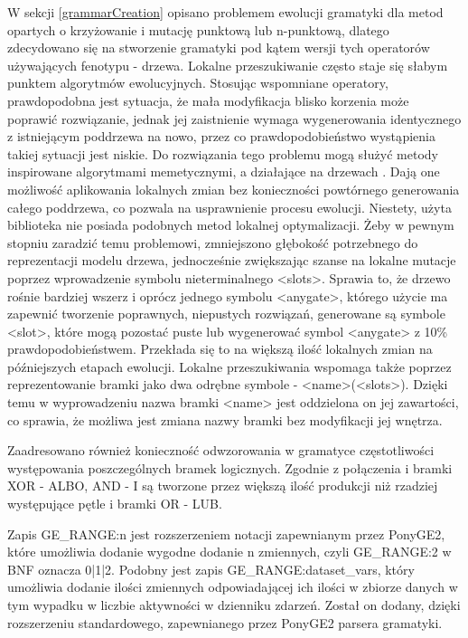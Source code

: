 W sekcji \ref{grammarCreation} opisano problemem ewolucji gramatyki dla metod opartych o krzyżowanie i mutację punktową lub n-punktową, dlatego zdecydowano się na stworzenie gramatyki pod kątem wersji tych operatorów używających fenotypu - drzewa. Lokalne przeszukiwanie często staje się słabym punktem algorytmów ewolucyjnych. Stosując wspomniane operatory, prawdopodobna jest sytuacja, że mała modyfikacja blisko korzenia może poprawić rozwiązanie, jednak jej zaistnienie wymaga wygenerowania identycznego z istniejącym poddrzewa na nowo, przez co prawdopodobieństwo wystąpienia takiej sytuacji jest niskie. Do rozwiązania tego problemu mogą służyć metody inspirowane algorytmami memetycznymi, a działające na drzewach \cite{memetic}. Dają one możliwość aplikowania lokalnych zmian bez konieczności powtórnego generowania całego poddrzewa, co pozwala na usprawnienie procesu ewolucji. Niestety, użyta biblioteka nie posiada podobnych metod lokalnej optymalizacji. Żeby w pewnym stopniu zaradzić temu problemowi, zmniejszono głębokość potrzebnego do reprezentacji modelu drzewa, jednocześnie zwiększając szanse na lokalne mutacje poprzez wprowadzenie symbolu nieterminalnego <slots>. Sprawia to, że drzewo rośnie bardziej wszerz i oprócz jednego symbolu <anygate>, którego użycie ma zapewnić tworzenie poprawnych, niepustych rozwiązań, generowane są symbole <slot>, które mogą pozostać puste lub wygenerować symbol <anygate> z 10\% prawdopodobieństwem. Przekłada się to na większą ilość lokalnych zmian na późniejszych etapach ewolucji. Lokalne przeszukiwania wspomaga także poprzez reprezentowanie bramki jako dwa odrębne symbole - <name>(<slots>). Dzięki temu w wyprowadzeniu nazwa bramki <name> jest oddzielona on jej zawartości, co sprawia, że możliwa jest zmiana nazwy bramki bez modyfikacji jej wnętrza.

Zaadresowano również konieczność odwzorowania w gramatyce częstotliwości występowania poszczególnych bramek logicznych. Zgodnie z \cite{10.1007/978-3-540-69534-9_35} połączenia i bramki XOR - ALBO, AND - I są tworzone przez większą ilość produkcji niż rzadziej występujące pętle i bramki OR - LUB. 

Zapis GE{\_}RANGE:n jest rozszerzeniem notacji zapewnianym przez PonyGE2, które umożliwia dodanie wygodne dodanie n zmiennych, czyli GE{\_}RANGE:2 w BNF oznacza 0|1|2.
Podobny jest zapis GE{\_}RANGE:dataset{\_}vars, który umożliwia dodanie ilości zmiennych odpowiadającej ich ilości w zbiorze danych w tym wypadku w liczbie aktywności w dzienniku zdarzeń. Został on dodany, dzięki rozszerzeniu standardowego, zapewnianego przez PonyGE2 parsera gramatyki.

